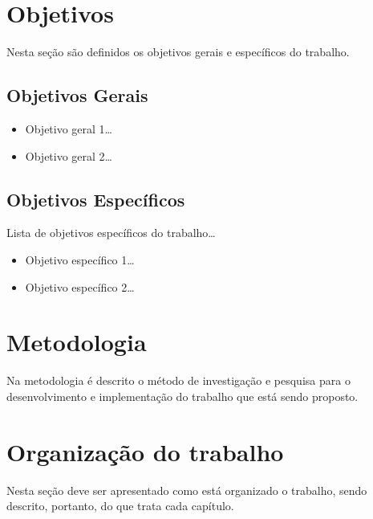 \section{Objetivos}

Nesta seção são definidos os objetivos gerais e específicos do trabalho.

\subsection{Objetivos Gerais}

\begin{itemize}
  \item Objetivo geral 1\ldots
  \item Objetivo geral 2\ldots  
\end{itemize}

\subsection{Objetivos Específicos} 

Lista de objetivos específicos do trabalho\ldots

\begin{itemize}
  \item Objetivo específico 1\ldots
  \item Objetivo específico 2\ldots  
\end{itemize}

\section{Metodologia}

Na metodologia é descrito o método de investigação e pesquisa para o
desenvolvimento e implementação do trabalho que está sendo proposto.

\section{Organização do trabalho}

Nesta seção deve ser apresentado como está organizado o trabalho, sendo
descrito, portanto, do que trata cada capítulo.

